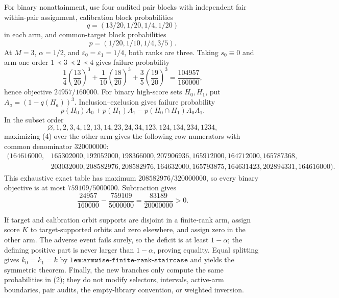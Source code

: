 For binary nonattainment, use four audited pair blocks with independent fair within-pair assignment, calibration block probabilities
\[
q=(13/20,1/20,1/4,1/20)
\]
in each arm, and common-target block probabilities
\[
p=(1/20,1/10,1/4,3/5).
\]
At \(M=3\), \(\alpha=1/2\), and \(\varepsilon_0=\varepsilon_1=1/4\), both ranks are three. Taking \(s_0\equiv0\) and arm-one order \(1\prec3\prec2\prec4\) gives failure probability
\[
\frac14\left(\frac{13}{20}\right)^3
+\frac1{10}\left(\frac{18}{20}\right)^3
+\frac35\left(\frac{19}{20}\right)^3
=\frac{104957}{160000},
\]
hence objective \(24957/160000\). For binary high-score sets \(H_0,H_1\), put \(A_a=(1-q(H_a))^3\). Inclusion--exclusion gives failure probability
\[
p(H_0)A_0+p(H_1)A_1-p(H_0\cap H_1)A_0A_1.
\tag{4}
\]
In the subset order
\[
\varnothing,1,2,3,4,12,13,14,23,24,34,123,124,134,234,1234,
\]
maximizing (4) over the other arm gives the following row numerators with common denominator \(320000000\):
\[
\begin{split}
(164616000,&165302000,192052000,198366000,207906936,165912000,164712000,165787368,\\
&203032000,208582976,208582976,164632000,165793875,164631423,202894331,164616000).
\end{split}
\]
This exhaustive exact table has maximum \(208582976/320000000\), so every binary objective is at most \(759109/5000000\). Subtraction gives
\[
\frac{24957}{160000}-\frac{759109}{5000000}
=\frac{83189}{20000000}>0.
\tag{5}
\]

If target and calibration orbit supports are disjoint in a finite-rank arm, assign score \(K\) to target-supported orbits and zero elsewhere, and assign zero in the other arm. The adverse event fails surely, so the deficit is at least \(1-\alpha\); the defining positive part is never larger than \(1-\alpha\), proving equality. Equal splitting gives \(k_0=k_1=k\) by \(\texttt{lem:armwise-finite-rank-staircase}\) and yields the symmetric theorem. Finally, the new branches only compute the same probabilities in (2); they do not modify selectors, intervals, active-arm boundaries, pair audits, the empty-library convention, or weighted inversion.